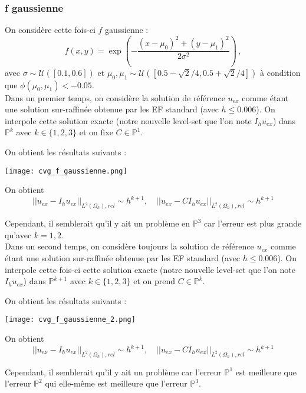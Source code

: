 \subsubsection*{f gaussienne}

On considère cette fois-ci $f$ gaussienne :
$$f(x,y) = \exp\left(-\frac{(x-\mu_0)^2 + (y-\mu_1)^2}{2\sigma^2}\right)\,, $$ 
avec $\sigma \sim \mathcal{U}([0.1,0.6])$ et $\mu_0, \mu_1 \sim \mathcal{U}([0.5-\sqrt{2}/4, 0.5+\sqrt{2}/4])$ à condition que $\phi(\mu_0, \mu_1) < -0.05$. \\

Dans un premier temps, on considère la solution de référence $u_{ex}$ comme étant une solution sur-raffinée obtenue par les EF standard (avec $h\le 0.006$).  On interpole cette solution exacte (notre nouvelle level-set que l'on note $I_h u_{ex}$) dans $\mathbb{P}^k$ avec $k\in\{1,2,3\}$ et on fixe $C\in\mathbb{P}^1$.  


On obtient les résultats suivants :

\begin{minipage}{\linewidth}
	\centering
	\texttt{[image: cvg\_f\_gaussienne.png]}
\end{minipage}

On obtient
$$||u_{ex}-I_h u_{ex}||_{L^2(\Omega_h),rel}\sim h^{k+1}, \quad ||u_{ex}-CI_h u_{ex}||_{L^2(\Omega_h),rel}\sim h^{k+1}$$

Cependant, il semblerait qu'il y ait un problème en $\mathbb{P}^3$ car l'erreur est plus grande qu'avec $k=1,2$. \\

Dans un second temps, on considère toujours la solution de référence $u_{ex}$ comme étant une solution sur-raffinée obtenue par les EF standard (avec $h\le 0.006$). On interpole cette fois-ci cette solution exacte (notre nouvelle level-set que l'on note $I_h u_{ex}$) dans $\mathbb{P}^{k+1}$ avec $k\in\{1,2,3\}$ et on prend $C\in\mathbb{P}^k$.  

On obtient les résultats suivants :

\begin{minipage}{\linewidth}
	\centering
	\texttt{[image: cvg\_f\_gaussienne\_2.png]}
\end{minipage}

On obtient
$$||u_{ex}-I_h u_{ex}||_{L^2(\Omega_h),rel}\sim h^{k+1}, \quad ||u_{ex}-CI_h u_{ex}||_{L^2(\Omega_h),rel}\sim h^{k+1}$$

Cependant, il semblerait qu'il y ait un problème car l'erreur $\mathbb{P}^1$ est meilleure que l'erreur $\mathbb{P}^2$ qui elle-même est meilleure que l'erreur $\mathbb{P}^3$.


